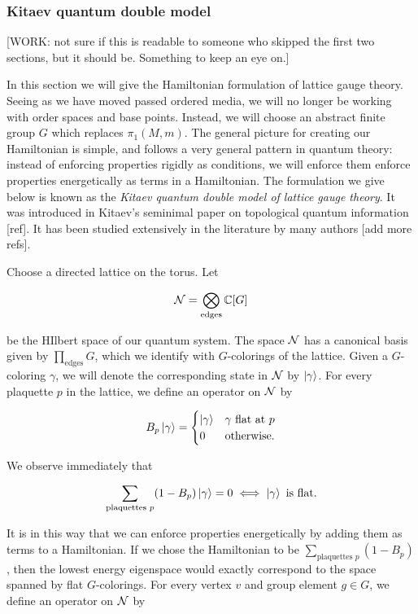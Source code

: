 \documentclass{article}
\theoremstyle{definition}
\numberwithin{figure}{section}
\begin{document}
\subsubsection{Kitaev quantum double model}

[WORK: not sure if this is readable to someone who skipped the first two sections, but it should be. Something to keep an eye on.]

In this section we will give the Hamiltonian formulation of lattice gauge theory. Seeing as we have moved passed ordered media, we will no longer be working with order spaces and base points. Instead, we will choose an abstract finite group $G$ which replaces $\pi_1(M,m)$. The general picture for creating our Hamiltonian is simple, and follows a very general pattern in quantum theory: instead of enforcing properties rigidly as conditions, we will enforce them enforce properties energetically as terms in a Hamiltonian. The formulation we give below is known as the \textit{Kitaev quantum double model of lattice gauge theory}. It was introduced in Kitaev's seminimal paper on topological quantum information [ref]. It has been studied extensively in the literature by many authors [add more refs].

Choose a directed lattice on the torus. Let

$$\mathcal{N}=\bigotimes_{\text{edges}}\mathbb{C}[G]$$

be the HIlbert space of our quantum system. The space $\mathcal{N}$ has a canonical basis given by $\prod_{\text{edges}}G$, which we  identify with $G$-colorings of the lattice. Given a $G$-coloring $\gamma$, we will denote the corresponding state in $\mathcal{N}$ by $\ket{\gamma}$. For every plaquette $p$ in the lattice, we define an operator on $\mathcal{N}$ by

$$B_p\ket{\gamma}=
\begin{cases}
\ket{\gamma} & \gamma \text{ flat at }p\\
0 & \text{otherwise}.
\end{cases}$$

We observe immediately that

$$\sum_{\text{plaquettes }p}(1-B_p)\ket{\gamma}=0 \iff \ket{\gamma} \text{ is flat.}$$

It is in this way that we can enforce properties energetically by adding them as terms to a Hamiltonian. If we chose the Hamiltonian to be $\sum_{\text{plaquettes }p}(1-B_p)$, then the lowest energy eigenspace would exactly correspond to the space spanned by flat $G$-colorings. For every vertex $v$ and group element $g\in G$, we define an operator on $\mathcal{N}$ by
\end{document}

